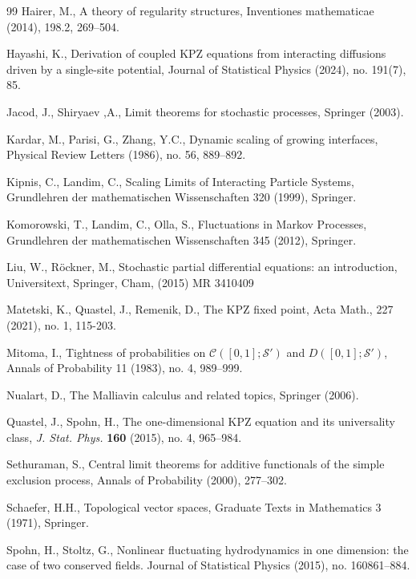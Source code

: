 \documentclass[a4paper, reqno, 12pt]{amsart}
\theoremstyle{plain}
\theoremstyle{definition}
\begin{document}
\begin{thebibliography}{99}
 Hairer, M., A theory of regularity structures,  Inventiones mathematicae (2014), 198.2, 269--504.

 Hayashi, K., Derivation of coupled KPZ equations from interacting diffusions driven by a single-site potential, Journal of Statistical Physics (2024), no. 191(7), 85.

 Jacod, J., Shiryaev ,A., Limit theorems for stochastic processes, Springer (2003).

 Kardar, M., Parisi, G., Zhang, Y.C., Dynamic scaling of growing interfaces, Physical Review Letters  (1986), no. 56,  889--892.

 Kipnis, C., Landim, C., Scaling Limits of Interacting Particle Systems, Grundlehren der mathematischen Wissenschaften 320 (1999), Springer.

 Komorowski, T., Landim, C., Olla, S., Fluctuations in Markov Processes, Grundlehren der mathematischen Wissenschaften 345 (2012), Springer.

 Liu, W., R{\"o}ckner, M., Stochastic partial differential equations: an introduction, Universitext, Springer, Cham, (2015) MR 3410409

 Matetski, K.,  Quastel, J., Remenik, D., The {KPZ} fixed point, Acta Math., 227 (2021), no. 1, 115-203.

 Mitoma, I., Tightness of probabilities on $\mathcal{C}([0,1];\mathcal{S}')$ and $D([0,1];\mathcal{S}')$, Annals of Probability 11 (1983), no. 4, 989–999.

 Nualart, D., The Malliavin calculus and related topics, Springer (2006).

 Quastel, J., Spohn, H., The one-dimensional KPZ equation and its universality class, \emph{J. Stat. Phys.} \textbf{160} (2015), no. 4, 965–984.

 Sethuraman, S., Central limit theorems for additive functionals of the simple exclusion process, Annals of Probability (2000), 277--302.

 Schaefer, H.H., Topological vector spaces, Graduate Texts in Mathematics 3 (1971), Springer.




 Spohn, H., Stoltz, G., Nonlinear fluctuating hydrodynamics in one dimension: the case of two conserved fields. Journal of Statistical Physics (2015), no. 160861--884.
\end{thebibliography}
\end{document}
